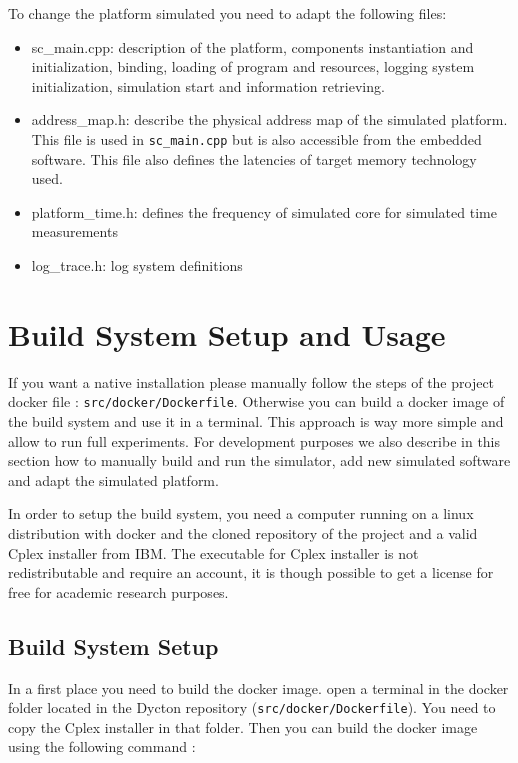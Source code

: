 \documentclass[10 pt]{article}
\begin{document}
To change the platform simulated you need to adapt the following files:
\begin{itemize}
  \item sc\_main.cpp: description of the platform, components instantiation and initialization, binding, loading of program and resources, logging system initialization, simulation start and information retrieving.
  \item address\_map.h: describe the physical address map of the simulated platform. This file is used in \lstinline{sc_main.cpp} but is also accessible from the embedded software. This file also defines the latencies of target memory technology used.
  \item platform\_time.h: defines the frequency of simulated core for simulated time measurements
  \item log\_trace.h: log system definitions
\end{itemize}




\section{Build System Setup and Usage}
If you want a native installation please manually follow the steps of the project docker file : \lstinline{src/docker/Dockerfile}.
Otherwise you can build a docker image of the build system and use it in a terminal.
This approach is way more simple and allow to run full experiments.
For development purposes we also describe in this section how to manually build and run the simulator, add new simulated software and adapt the simulated platform.

\bigskip
In order to setup the build system, you need a computer running on a linux distribution with docker and the cloned repository of the project and a valid Cplex installer from IBM.
The executable for Cplex installer is not redistributable and require an account, it is though possible to get a license for free for academic research purposes.


\subsection{Build System Setup}
In a first place you need to build the docker image.
open a terminal in the docker folder located in the Dycton repository (\lstinline{src/docker/Dockerfile}).
You need to copy the Cplex installer in that folder.
Then you can build the docker image using the following command :
\end{document}
